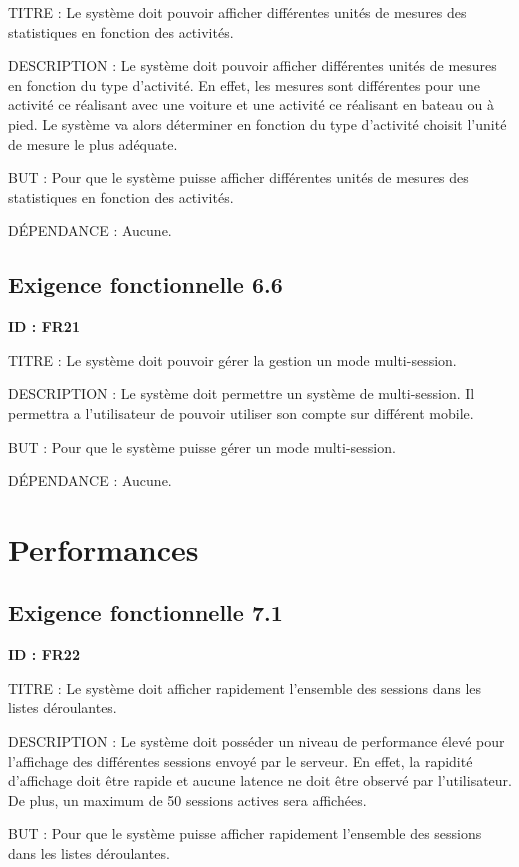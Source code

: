 \documentclass[titlepage, 12pt]{report}
\begin{document}
TITRE : Le système doit pouvoir afficher différentes unités de mesures des statistiques en fonction des activités.

DESCRIPTION : Le système doit pouvoir afficher différentes unités de mesures en fonction du type d'activité. En effet, les mesures sont différentes pour une activité ce réalisant avec une voiture et une activité ce réalisant en bateau ou à pied. Le système va alors déterminer en fonction du type d'activité choisit l'unité de mesure le plus adéquate.

BUT : Pour que le système puisse afficher différentes unités de mesures des statistiques en fonction des activités.

DÉPENDANCE : Aucune.

\subsection{Exigence fonctionnelle 6.6}

\textbf{ID : FR21}

TITRE : Le système doit pouvoir gérer la gestion un mode multi-session.

DESCRIPTION : Le système doit permettre un système de multi-session. Il permettra a l'utilisateur de pouvoir utiliser son compte sur différent mobile.

BUT : Pour que le système puisse gérer un mode multi-session.

DÉPENDANCE : Aucune.

\section{Performances}

\subsection{Exigence fonctionnelle 7.1}

\textbf{ID : FR22}

TITRE : Le système doit afficher rapidement l'ensemble des sessions dans les listes déroulantes.

DESCRIPTION : Le système doit posséder un niveau de performance élevé pour l'affichage des différentes sessions envoyé par le serveur. En effet, la rapidité d'affichage doit être rapide et aucune latence ne doit être observé par l'utilisateur. De plus, un maximum de 50 sessions actives sera affichées. 

BUT : Pour que le système puisse afficher rapidement l'ensemble des sessions dans les listes déroulantes.
\end{document}
